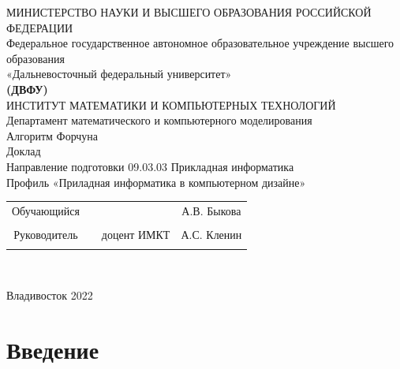 \documentclass[ a4paper]{article}
\begin{document}
\begin{center}
\hfill \break
\large{МИНИСТЕРСТВО НАУКИ И ВЫСШЕГО ОБРАЗОВАНИЯ РОССИЙСКОЙ ФЕДЕРАЦИИ}\\
\footnotesize{Федеральное государственное автономное образовательное учреждение высшего образования}\\ 
\footnotesize{«Дальневосточный федеральный университет»}\\
\small{\textbf{(ДВФУ)}}\\
\hfill \break
\normalsize{ИНСТИТУТ МАТЕМАТИКИ И КОМПЬЮТЕРНЫХ ТЕХНОЛОГИЙ}\\
 \hfill \break
\normalsize{Департамент математического и компьютерного моделирования}\\
\hfill\break
\hfill \break
\hfill \break
\hfill \break
\large{Алгоритм Форчуна}\\
\hfill \break
\hfill \break
\hfill \break
\normalsize{Доклад\\
\hfill \break
Направление подготовки 09.03.03 Прикладная информатика\\
\hfill \break
Профиль «Приладная информатика в компьютерном дизайне»}\\
\hfill \break
\hfill \break
\end{center}
 
\normalsize{} \hfill \break
\hfill \break
 
\normalsize{ 
\begin{tabular}{cccc}
Обучающийся & \underline{\hspace{3cm}} & &А.В. Быкова \\\\
Руководитель & \underline{\hspace{3cm}}& доцент ИМКТ &А.С. Кленин \\\\
\end{tabular}
}\\
\hfill \break
\hfill \break
\begin{center} Владивосток 2022 \end{center}
\thispagestyle{empty} 
 
\newpage
     
    \tableofcontents 
\newpage


\section{Введение}
\end{document}

